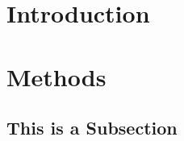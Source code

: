 \documentclass[letterpaper,man,natbib]{apa6}
\title{}  %
\author{Tziporah Horowitz}
\affiliation{Johns Hopkins University}
\begin{document}


\section{Introduction}\label{sec:introduction}

\pagebreak

\section{Methods}\label{sec:methods}

\begin{minipage}{.9\linewidth}
 
\end{minipage}


\subsection{This is a Subsection}\label{subsec:this-is-a-subsection}


\pagebreak


\end{document}
